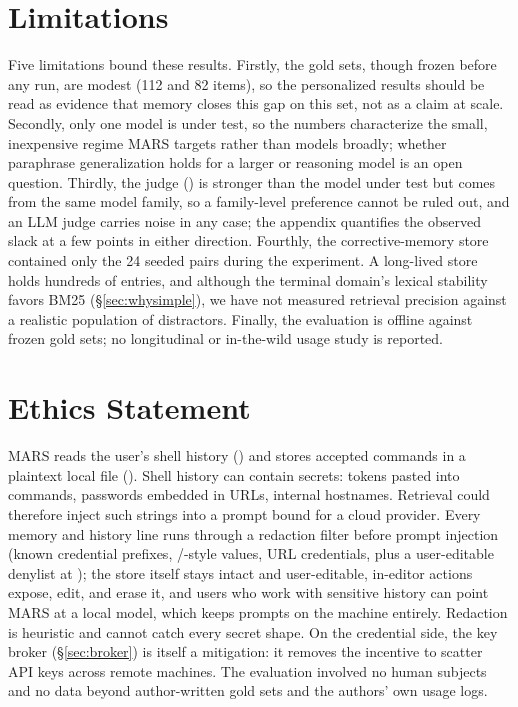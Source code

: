 \section*{Limitations}

Five limitations bound these results. Firstly, the gold sets, though frozen before any
run, are modest (112 and 82 items), so the personalized results should be read as
evidence that memory closes this gap on this set, not as a claim at scale. Secondly,
only one model is under test, so the numbers characterize the small, inexpensive regime
MARS targets rather than models broadly; whether paraphrase generalization holds for a
larger or reasoning model is an open question. Thirdly, the judge () is
stronger than the model under test but comes from the same model family, so a
family-level preference cannot be ruled out, and an LLM judge carries noise in any case;
the appendix quantifies the observed slack at a few points in either direction.
Fourthly, the corrective-memory store contained only the 24 seeded pairs during the
experiment. A long-lived store holds hundreds of entries, and although the terminal
domain's lexical stability favors BM25 (\S\ref{sec:whysimple}), we have not measured
retrieval precision against a realistic population of distractors. Finally, the
evaluation is offline against frozen gold sets; no longitudinal or in-the-wild usage
study is reported.

\section*{Ethics Statement}

MARS reads the user's shell history () and stores accepted commands in
a plaintext local file (). Shell history can contain
secrets: tokens pasted into commands, passwords embedded in URLs, internal hostnames.
Retrieval could therefore inject such strings into a prompt bound for a cloud provider.
Every memory and history line runs through a redaction filter before prompt
injection (known credential prefixes, /-style values, URL
credentials, plus a user-editable denylist at ); the store
itself stays intact and user-editable, in-editor actions expose, edit, and erase it, and
users who work with sensitive history can point MARS at a local model, which keeps
prompts on the machine entirely. Redaction is heuristic and cannot catch every secret
shape. On the credential side, the key broker
(\S\ref{sec:broker}) is itself a mitigation: it removes the incentive to scatter API
keys across remote machines. The evaluation involved no human subjects and no data
beyond author-written gold sets and the authors' own usage logs.
